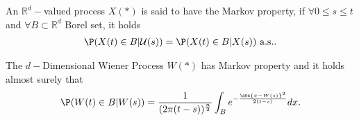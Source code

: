 \begin{definition}
 An $\mathbb{R}^{d}-$valued process $X(*)$ is said to have the Markov property, if $\forall  0\le s\le t$ and 
 $\forall B \subset  \mathbb{R}^{d} $ Borel set, it holds 
 \begin{align*}
   \P(X(t) \in  B | \mathcal{U}(s)) = \P(X(t) \in  B | X(s)) \text{ a.s.}
 .\end{align*}
\end{definition}
\begin{remark}
 The $d-$Dimensional Wiener Process $W(*)$  has Markov property and it holds almost surely that 
 \begin{align*}
  \P(W(t)\in B | W(s)) = \frac{1}{(2\pi(t-s))^{\frac{n}{2}} } \int_B e^{-\frac{\abs{x - W(s)}^2}{2(t-s)}}  dx
 .\end{align*}
\end{remark}
